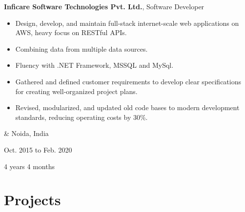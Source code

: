 \documentclass[10pt, letterpaper]{article}
\newenvironment{highlights}{
        \begin{itemize}[
                topsep=0pt,
                parsep=0.10 cm,
                partopsep=0pt,
                itemsep=0pt,
                after=\vspace{-1\baselineskip},
                leftmargin=0.4 cm + 3pt
            ]
    }{
        \end{itemize}
    } %
\let\originalTabularx\tabularx
\let\originalEndTabularx\endtabularx
\renewenvironment{tabularx}{\bgroup\centering\originalTabularx}{\originalEndTabularx\par\egroup}
\begin{document}
        \vspace{0.2 cm}
        \begin{tabularx}{
            \textwidth-0.4 cm-0.13cm
        }{
            K{0.2 cm}
            R{4.1 cm}
        }
            \textbf{Inficare Software Technologies Pvt. Ltd.}, Software Developer

            \vspace{0.10 cm}

            \begin{highlights}
                \item Design, develop, and maintain full-stack internet-scale web applications on AWS, heavy focus on RESTful APIs.
                \item Combining data from multiple data sources.
                \item Fluency with .NET Framework, MSSQL and MySql.
                \item Gathered and defined customer requirements to develop clear specifications for creating well-organized project plans.
                \item Revised, modularized, and updated old code bases to modern development standards, reducing operating costs by 30\%.
            \end{highlights}
            &
            Noida, India

            Oct. 2015 to Feb. 2020

            4 years 4 months
        \end{tabularx}


    
    \section{Projects}
\end{document}
